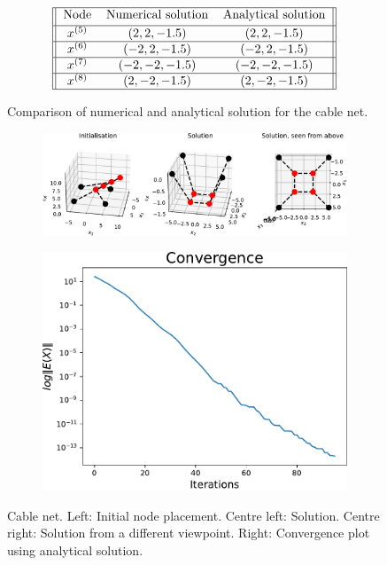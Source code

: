 \begin{figure}    
\caption{Comparison of numerical and analytical solution for the cable net.}
\label{P25Table}
\begin{gather*}
\begin{tabular}{||c c c||} 
    \hline
    Node & Numerical solution & Analytical solution \\ [0.5ex] 
    \hline
    $x^{(5)}$ & $(2,2,-1.5)$ & $(2,2,-1.5)$  \\ 
    \hline
    $x^{(6)}$ & $(-2,2,-1.5)$& $(-2,2,-1.5)$  \\ 
    \hline
    $x^{(7)}$ & $(-2,-2,-1.5)$ & $(-2,-2,-1.5)$\\ 
    \hline
    $x^{(8)}$ & $(2,-2,-1.5)$ & $(2,-2,-1.5)$ \\ 
    \hline
\end{tabular}
\end{gather*}
\end{figure}



\begin{figure}[!ht]
\centering
\begin{subfigure}{.72\textwidth}
  \centering
  \includegraphics[width=0.99\linewidth]{Bilder/p25.pdf}
\end{subfigure}%
\begin{subfigure}{.3\textwidth}
  \centering
  \includegraphics[width=0.99\linewidth]{Bilder/P25conv.pdf}
\end{subfigure}
\caption{Cable net. Left: Initial node placement. Centre left: Solution. Centre right: Solution from a different viewpoint. Right: Convergence plot using analytical solution.}
\label{P25}
\end{figure}

